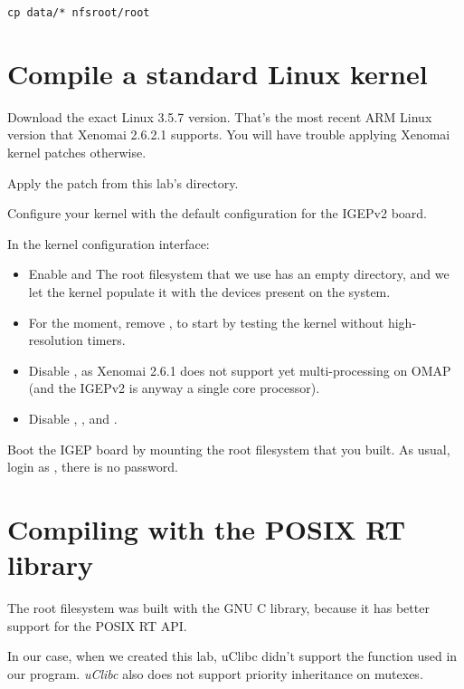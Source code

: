 \begin{verbatim}
cp data/* nfsroot/root
\end{verbatim}

\section{Compile a standard Linux kernel}

Download the exact Linux 3.5.7 version. That's the most recent
ARM Linux version that Xenomai 2.6.2.1 supports. You will have trouble
applying Xenomai kernel patches otherwise.

Apply the  patch from this
lab's  directory.

Configure your kernel with the default configuration for the IGEPv2
board.

In the kernel configuration interface:
\begin{itemize}
\item Enable  and 
      The root filesystem that we use has an empty 
      directory, and we let the kernel populate it with the devices
      present on the system.
\item For the moment, remove ,
      to start by testing the kernel without high-resolution timers.
\item Disable , as Xenomai 2.6.1 does not support
  yet multi-processing on OMAP (and the IGEPv2 is anyway a single
  core processor).
\item Disable ,
  ,  and
  .
\end{itemize}

Boot the IGEP board by mounting the root filesystem that you built.
As usual, login as , there is no password.

\section{Compiling with the POSIX RT library}

The root filesystem was built with the GNU C library, because it has
better support for the POSIX RT API.

In our case, when we created this lab, uClibc
didn't support the  function used in our
 program. {\em uClibc} also does not support priority
inheritance on mutexes.

